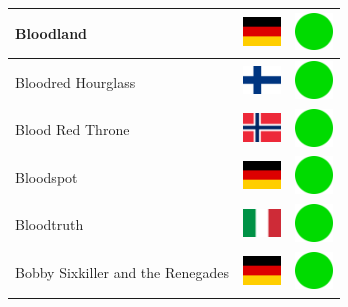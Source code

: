 \documentclass[12pt, a4paper, twoside]{report}
\begin{document}
\begin{center}
\begin{longtable}{|p{5cm}|p{2cm}|p{2cm}|}
			Bloodland & \includegraphics[width=1cm]{4x3/de} & \includegraphics[width=1cm]{likes/y} \\ \hline
			Bloodred Hourglass & \includegraphics[width=1cm]{4x3/fi} & \includegraphics[width=1cm]{likes/y} \\ \hline
			Blood Red Throne & \includegraphics[width=1cm]{4x3/no} & \includegraphics[width=1cm]{likes/y} \\ \hline
			Bloodspot & \includegraphics[width=1cm]{4x3/de} & \includegraphics[width=1cm]{likes/y} \\ \hline
			Bloodtruth & \includegraphics[width=1cm]{4x3/it} & \includegraphics[width=1cm]{likes/y} \\ \hline
			Bobby Sixkiller and the Renegades & \includegraphics[width=1cm]{4x3/de} & \includegraphics[width=1cm]{likes/y} \\ \hline

\end{longtable}
\end{center}
\end{document}
